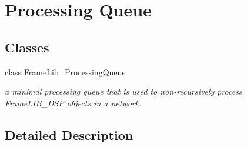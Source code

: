 \hypertarget{group___processing_queue}{}\section{Processing Queue}
\label{group___processing_queue}
\subsection*{Classes}
\begin{DoxyCompactItemize}
\item 
class \hyperlink{class_frame_lib___processing_queue}{Frame\+Lib\+\_\+\+Processing\+Queue}
\begin{DoxyCompactList}\small\item\em a minimal processing queue that is used to non-\/recursively process Frame\+L\+I\+B\+\_\+\+D\+SP objects in a network. \end{DoxyCompactList}\end{DoxyCompactItemize}


\subsection{Detailed Description}
